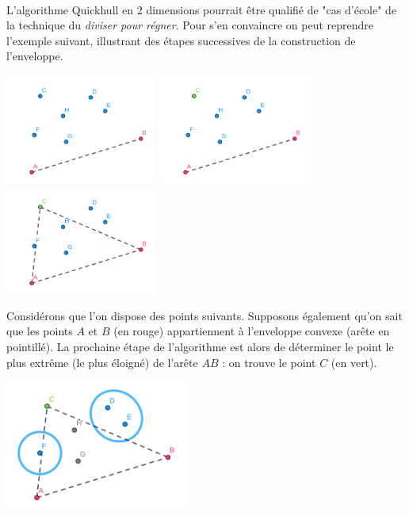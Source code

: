 \documentclass[]{article}
\begin{document}
\paragraph{}
L'algorithme Quickhull en 2 dimensions pourrait être qualifié de "cas d'école" de la technique du \emph{diviser pour régner}. Pour s'en convaincre on peut reprendre l'exemple suivant, illustrant des étapes successives de la construction de l'enveloppe.

\includegraphics[width=5cm]{qh2d/geogebra-export.png}
\includegraphics[width=5cm]{qh2d/geogebra-export2.png}
\includegraphics[width=5cm]{qh2d/geogebra-export3.png}

Considérons que l'on dispose des points suivants. Supposons également qu'on sait que les points $A$ et $B$ (en rouge) appartiennent à l'enveloppe convexe (arête en pointillé). La prochaine étape de l'algorithme est alors de déterminer le point le plus extrême (le plus éloigné) de l'arête $AB$ : on trouve le point $C$ (en vert).

\includegraphics[width=6cm]{qh2d/geogebra-export4.png}
\end{document}
